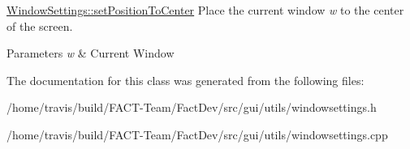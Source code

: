 \hyperlink{classGui_1_1Utils_1_1WindowSettings_a672a669c93a49565f4bbe06c7ad876c4}{Window\-Settings\-::set\-Position\-To\-Center} Place the current window {\itshape w} to the center of the screen. 


\begin{DoxyParams}{Parameters}
{\em w} & Current Window \\
\hline
\end{DoxyParams}


The documentation for this class was generated from the following files\-:\begin{DoxyCompactItemize}
\item 
/home/travis/build/\-F\-A\-C\-T-\/\-Team/\-Fact\-Dev/src/gui/utils/windowsettings.\-h\item 
/home/travis/build/\-F\-A\-C\-T-\/\-Team/\-Fact\-Dev/src/gui/utils/windowsettings.\-cpp\end{DoxyCompactItemize}
